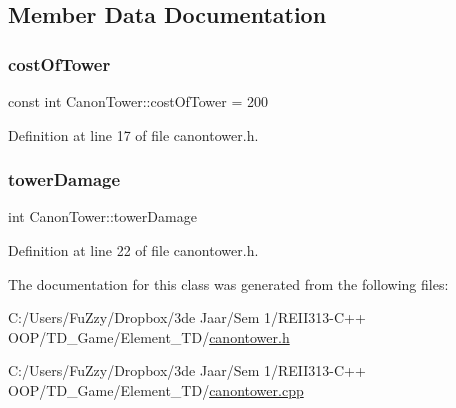 \subsection{Member Data Documentation}
\mbox{\label{class_canon_tower_a545089ae31859c4bf0e46316c637383b}} 
\subsubsection{\texorpdfstring{cost\+Of\+Tower}{costOfTower}}
{\footnotesize\ttfamily const int Canon\+Tower\+::cost\+Of\+Tower = 200}



Definition at line 17 of file canontower.\+h.

\mbox{\label{class_canon_tower_a26ea42f5a200246080dfba01340f057b}} 
\subsubsection{\texorpdfstring{tower\+Damage}{towerDamage}}
{\footnotesize\ttfamily int Canon\+Tower\+::tower\+Damage\hspace{0.3cm}{\ttfamily [private]}}



Definition at line 22 of file canontower.\+h.



The documentation for this class was generated from the following files\+:\begin{DoxyCompactItemize}
\item 
C\+:/\+Users/\+Fu\+Zzy/\+Dropbox/3de Jaar/\+Sem 1/\+R\+E\+I\+I313-\/\+C++ O\+O\+P/\+T\+D\+\_\+\+Game/\+Element\+\_\+\+T\+D/\hyperlink{canontower_8h}{canontower.\+h}\item 
C\+:/\+Users/\+Fu\+Zzy/\+Dropbox/3de Jaar/\+Sem 1/\+R\+E\+I\+I313-\/\+C++ O\+O\+P/\+T\+D\+\_\+\+Game/\+Element\+\_\+\+T\+D/\hyperlink{canontower_8cpp}{canontower.\+cpp}\end{DoxyCompactItemize}

